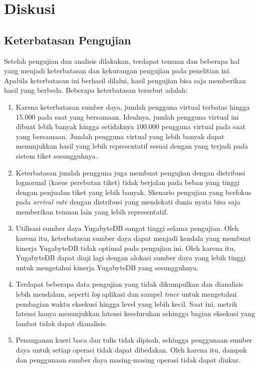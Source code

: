 \section{Diskusi}

\subsection{Keterbatasan Pengujian}
\label{keterbatasan-pengujian}

Setelah pengujian dan analisis dilakukan, terdapat temuan dan beberapa hal yang menjadi keterbatasan dan kekurangan pengujian pada penelitian ini. Apabila keterbatasan ini berhasil dilalui, hasil pengujian bisa saja memberikan hasil yang berbeda. Beberapa keterbatasan tersebut adalah:

\begin{enumerate}
    \item Karena keterbatasan sumber daya, jumlah pengguna virtual terbatas hingga 15.000 pada saat yang bersamaan. Idealnya, jumlah pengguna virtual ini dibuat lebih banyak hingga setidaknya 100.000 pengguna virtual pada saat yang bersamaan. Jumlah pengguna virtual yang lebih banyak dapat menunjukkan hasil yang lebih representatif sesuai dengan yang terjadi pada sistem tiket sesungguhnya.
    \item Keterbatasan jumlah pengguna juga membuat pengujian dengan distribusi lognormal (kasus perebutan tiket) tidak berjalan pada beban yang tinggi dengan penjualan tiket yang lebih banyak. Skenario pengujian yang berfokus pada \textit{arrival rate} dengan distribusi yang mendekati dunia nyata bisa saja memberikan temuan lain yang lebih representatif.
    \item Utilisasi sumber daya YugabyteDB sangat tinggi selama pengujian. Oleh karena itu, keterbatasan sumber daya dapat menjadi kendala yang membuat kinerja YugabyteDB tidak optimal pada pengujian ini. Oleh karena itu, YugabyteDB dapat diuji lagi dengan alokasi sumber daya yang lebih tinggi untuk mengetahui kinerja YugabyteDB yang sesungguhnya.
    \item Terdapat beberapa data pengujian yang tidak dikumpulkan dan dianalisis lebih mendalam, seperti \textit{log} aplikasi dan sampel \textit{trace} untuk mengetahui pembagian waktu eksekusi hingga level yang lebih kecil. Saat ini, metrik latensi hanya menunjukkan latensi keseluruhan sehingga bagian eksekusi yang lambat tidak dapat dianalisis.
    \item Penanganan kueri baca dan tulis tidak dipisah, sehingga penggunaan sumber daya untuk setiap operasi tidak dapat dibedakan. Oleh karena itu, dampak dan penggunaan sumber daya masing-masing operasi tidak dapat diukur.
\end{enumerate}

